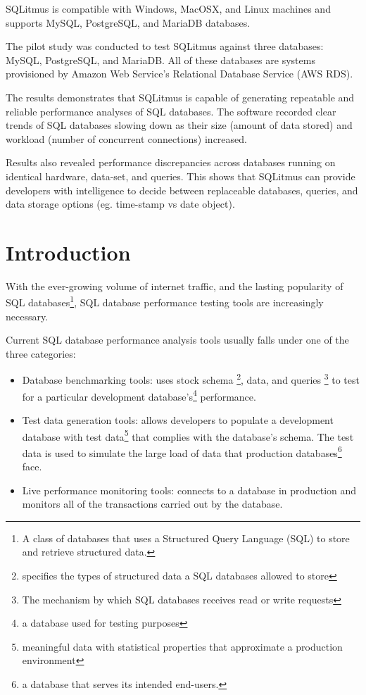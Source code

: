 \documentclass[12pt]{article}
\begin{document}
\begin{spacing}{1.9}
		SQLitmus is compatible with Windows, MacOSX, and Linux machines and supports MySQL, PostgreSQL, and MariaDB databases. 
		
		The pilot study was conducted to test SQLitmus against three databases: MySQL, PostgreSQL, and MariaDB. All of these databases are systems provisioned by Amazon Web Service's Relational Database Service (AWS RDS). 
		
		The results demonstrates that SQLitmus is capable of generating repeatable and reliable performance analyses of SQL databases. The software recorded clear trends of SQL databases slowing down as their size (amount of data stored) and workload (number of concurrent connections) increased. 
		
		Results also revealed performance discrepancies across databases running on identical hardware, data-set, and queries. This shows that SQLitmus can provide developers with intelligence to decide between replaceable databases, queries, and data storage options (eg. time-stamp vs date object).  
		
		\clearpage
		
		\tableofcontents
		
		\clearpage
		
		\listoffigures
		
		\clearpage
		
		\section{Introduction}
		
		With the ever-growing volume of internet traffic, and the lasting popularity of SQL databases\footnote{ A class of databases that uses a Structured Query Language (SQL) to store and retrieve structured data. }, SQL database performance testing tools are increasingly necessary.
		
		Current SQL database performance analysis tools usually falls under one of the three categories:
		
		\begin{itemize}
			\item Database benchmarking tools: uses stock schema \footnote{specifies the types of structured data a SQL databases allowed to store}, data, and queries \footnote{The mechanism by which SQL databases receives read or write requests} to test for a particular development database's\footnote{a database used for testing purposes} performance.
			\item Test data generation tools: allows developers to populate a development database with test data\footnote{ meaningful data with statistical properties that approximate a production environment} that complies with the database's schema. The test data is used to simulate the large load of data that production databases\footnote{a database that serves its intended end-users.} face.
			\item Live performance monitoring tools: connects to a database in production and monitors all of the transactions carried out by the database.
		\end{itemize}
		

\end{spacing}
\end{document}
